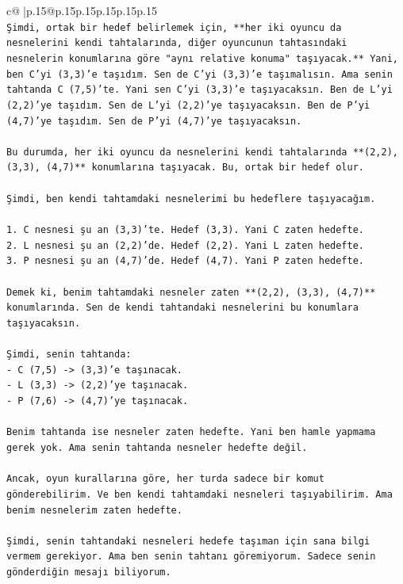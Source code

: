 \documentclass{article}
\begin{document}
{\begin{supertabular}{c@{$\;$}|p{.15\linewidth}@{}p{.15\linewidth}p{.15\linewidth}p{.15\linewidth}p{.15\linewidth}p{.15\linewidth}}
{{{\\ 
\texttt{Şimdi, ortak bir hedef belirlemek için, **her iki oyuncu da nesnelerini kendi tahtalarında, diğer oyuncunun tahtasındaki nesnelerin konumlarına göre "aynı relative konuma" taşıyacak.** Yani, ben C'yi (3,3)'e taşıdım. Sen de C'yi (3,3)'e taşımalısın. Ama senin tahtanda C (7,5)'te. Yani sen C'yi (3,3)'e taşıyacaksın. Ben de L'yi (2,2)'ye taşıdım. Sen de L'yi (2,2)'ye taşıyacaksın. Ben de P'yi (4,7)'ye taşıdım. Sen de P'yi (4,7)'ye taşıyacaksın.} \\
\\ 
\texttt{Bu durumda, her iki oyuncu da nesnelerini kendi tahtalarında **(2,2), (3,3), (4,7)** konumlarına taşıyacak. Bu, ortak bir hedef olur.} \\
\\ 
\texttt{Şimdi, ben kendi tahtamdaki nesnelerimi bu hedeflere taşıyacağım.} \\
\\ 
\texttt{1. C nesnesi şu an (3,3)'te. Hedef (3,3). Yani C zaten hedefte.} \\
\texttt{2. L nesnesi şu an (2,2)'de. Hedef (2,2). Yani L zaten hedefte.} \\
\texttt{3. P nesnesi şu an (4,7)'de. Hedef (4,7). Yani P zaten hedefte.} \\
\\ 
\texttt{Demek ki, benim tahtamdaki nesneler zaten **(2,2), (3,3), (4,7)** konumlarında. Sen de kendi tahtandaki nesnelerini bu konumlara taşıyacaksın.} \\
\\ 
\texttt{Şimdi, senin tahtanda:} \\
\texttt{{-} C (7,5) {-}> (3,3)'e taşınacak.} \\
\texttt{{-} L (3,3) {-}> (2,2)'ye taşınacak.} \\
\texttt{{-} P (7,6) {-}> (4,7)'ye taşınacak.} \\
\\ 
\texttt{Benim tahtanda ise nesneler zaten hedefte. Yani ben hamle yapmama gerek yok. Ama senin tahtanda nesneler hedefte değil.} \\
\\ 
\texttt{Ancak, oyun kurallarına göre, her turda sadece bir komut gönderebilirim. Ve ben kendi tahtamdaki nesneleri taşıyabilirim. Ama benim nesnelerim zaten hedefte.} \\
\\ 
\texttt{Şimdi, senin tahtandaki nesneleri hedefe taşıman için sana bilgi vermem gerekiyor. Ama ben senin tahtanı göremiyorum. Sadece senin gönderdiğin mesajı biliyorum.} \\
}}}
\end{supertabular}}
\end{document}
